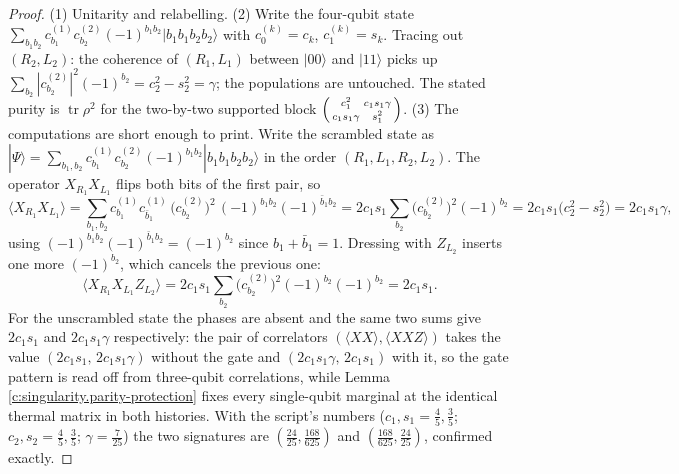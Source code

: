 \documentclass[11pt]{article}
\theoremstyle{definition}
\theoremstyle{plain}
\providecommand{\tr}{}\renewcommand{\tr}{\operatorname{tr}}
\begin{document}
\begin{proof}
(1) Unitarity and relabelling. (2) Write the four-qubit state $\sum_{b_1 b_2} c^{(1)}_{b_1} c^{(2)}_{b_2} (-1)^{b_1 b_2} |b_1 b_1 b_2 b_2\rangle$ with $c^{(k)}_0 = c_k$, $c^{(k)}_1 = s_k$. Tracing out $(R_2, L_2)$: the coherence of $(R_1, L_1)$ between $|00\rangle$ and $|11\rangle$ picks up $\sum_{b_2} |c^{(2)}_{b_2}|^2 (-1)^{b_2} = c_2^2 - s_2^2 = \gamma$; the populations are untouched. The stated purity is $\tr \rho^2$ for the two-by-two supported block $\begin{psmallmatrix} c_1^2 & c_1 s_1 \gamma \\ c_1 s_1 \gamma & s_1^2 \end{psmallmatrix}$. (3) The computations are short enough to print. Write the scrambled state as $|\Psi\rangle = \sum_{b_1, b_2} c^{(1)}_{b_1} c^{(2)}_{b_2} (-1)^{b_1 b_2} |b_1 b_1 b_2 b_2\rangle$ in the order $(R_1, L_1, R_2, L_2)$. The operator $X_{R_1}X_{L_1}$ flips both bits of the first pair, so
\[
\langle X_{R_1}X_{L_1}\rangle
= \sum_{b_1, b_2} c^{(1)}_{b_1} c^{(1)}_{\bar b_1}\, \bigl(c^{(2)}_{b_2}\bigr)^2\, (-1)^{b_1 b_2}(-1)^{\bar b_1 b_2}
= 2 c_1 s_1 \sum_{b_2} \bigl(c^{(2)}_{b_2}\bigr)^2 (-1)^{b_2}
= 2 c_1 s_1 \bigl(c_2^2 - s_2^2\bigr) = 2 c_1 s_1 \gamma ,
\]
using $(-1)^{b_1 b_2}(-1)^{\bar b_1 b_2} = (-1)^{b_2}$ since $b_1 + \bar b_1 = 1$. Dressing with $Z_{L_2}$ inserts one more $(-1)^{b_2}$, which cancels the previous one:
\[
\langle X_{R_1}X_{L_1} Z_{L_2}\rangle
= 2 c_1 s_1 \sum_{b_2} \bigl(c^{(2)}_{b_2}\bigr)^2 (-1)^{b_2}(-1)^{b_2}
= 2 c_1 s_1 .
\]
For the unscrambled state the phases are absent and the same two sums give $2 c_1 s_1$ and $2 c_1 s_1 \gamma$ respectively: the pair of correlators $(\langle XX\rangle, \langle XXZ\rangle)$ takes the value $(2c_1s_1,\, 2c_1s_1\gamma)$ without the gate and $(2c_1s_1\gamma,\, 2c_1s_1)$ with it, so the gate pattern is read off from three-qubit correlations, while Lemma \ref{c:singularity.parity-protection} fixes every single-qubit marginal at the identical thermal matrix in both histories. With the script's numbers ($c_1, s_1 = \tfrac45, \tfrac35$; $c_2, s_2 = \tfrac45, \tfrac35$; $\gamma = \tfrac{7}{25}$) the two signatures are $(\tfrac{24}{25}, \tfrac{168}{625})$ and $(\tfrac{168}{625}, \tfrac{24}{25})$, confirmed exactly.

\end{proof}
\end{document}
